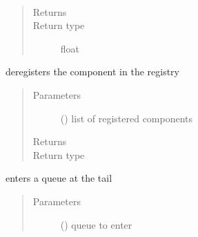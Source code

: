 \documentclass[letterpaper,10pt,english]{sphinxmanual}
\begin{document}
\begin{fulllineitems}
\begin{fulllineitems}
\end{fulllineitems}


\begin{fulllineitems}
\label{\detokenize{Reference:salabim.Component.creation_time}}~\begin{quote}\begin{description}
\item[{Returns}] \leavevmode
{}

\item[{Return type}] \leavevmode
float

\end{description}\end{quote}

\end{fulllineitems}


\begin{fulllineitems}
\label{\detokenize{Reference:salabim.Component.deregister}}
deregisters the component in the registry
\begin{quote}\begin{description}
\item[{Parameters}] \leavevmode
{} () \textendash{} list of registered components

\item[{Returns}] \leavevmode
{}

\item[{Return type}] \leavevmode
{\hyperref[\detokenize{Reference:salabim.Component}]{}}

\end{description}\end{quote}

\end{fulllineitems}


\begin{fulllineitems}
\label{\detokenize{Reference:salabim.Component.enter}}
enters a queue at the tail
\begin{quote}\begin{description}
\item[{Parameters}] \leavevmode
{} ({\hyperref[\detokenize{Reference:salabim.Queue}]{}}) \textendash{} queue to enter


\end{description}
\end{quote}
\end{fulllineitems}
\end{fulllineitems}
\end{document}
